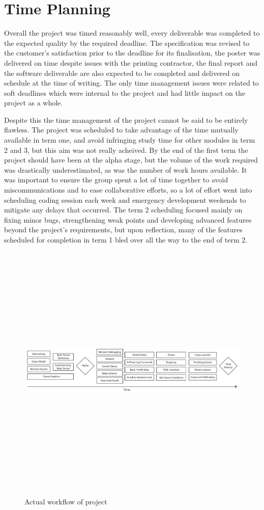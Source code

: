 \section{Time Planning}

Overall the project was timed reasonably well, every deliverable was completed to the expected quality by the required deadline. The specification was revised to the customer's satisfaction prior to the deadline for its finalisation, the poster was delivered on time despite issues with the printing contractor, the final report and the software deliverable are also expected to be completed and delivered on schedule at the time of writing. The only time management issues were related to soft deadlines which were internal to the project and had little impact on the project as a whole.

Despite this the time management of the project cannot be said to be entirely flawless.
The project was scheduled to take advantage of the time mutually available in term one, and avoid infringing study time for other modules in term 2 and 3, but this aim was not really acheived. 
By the end of the first term the project should have been at the alpha stage, but the volume of the work required was drastically underestimated, as was the number of work hours available. It was important to ensure the group spent a lot of time together to avoid miscommunications and to ease collaborative efforts, so a lot of effort went into scheduling coding session each week and emergency development weekends to mitigate any delays that occurred. The term 2 scheduling focused mainly on fixing minor bugs, strengthening weak points and developing advanced features beyond the project's requirements, but upon reflection, many of the features scheduled for completion in term 1 bled over all the way to the end of term 2. 

\begin{figure}
	\includegraphics[height=33em]{res/pm/actual_workflow_diagram}
	\label{fig:actual_workflow_diagram}
	\caption{Actual workflow of project}
\end{figure}

